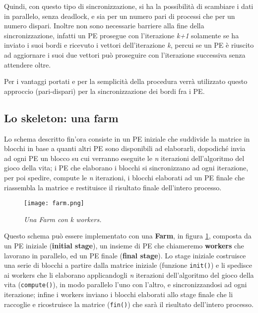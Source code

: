 Quindi, con questo tipo di sincronizzazione, si ha la possibilit\`a di scambiare i dati in parallelo, senza deadlock, e sia per un numero pari di processi che per un numero dispari. Inoltre non sono necessarie barriere alla fine della sincronizzazione, infatti un PE prosegue con l'iterazione \textit{k+1} solamente se ha inviato i suoi bordi e ricevuto i vettori dell'iterazione \textit{k}, percui se un PE \`e riuscito ad aggiornare i suoi due vettori pu\`o proseguire con l'iterazione successiva senza attendere oltre.

Per i vantaggi portati e per la semplicit\`a della procedura verr\`a utilizzato questo approccio (pari-dispari) per la sincronizzazione dei bordi fra i PE.

\subsection{Lo skeleton: una farm}
Lo schema descritto fin'ora consiste in un PE iniziale che suddivide la matrice in blocchi in base a quanti altri PE sono disponibili ad elaborarli, dopodich\'e invia ad ogni PE un blocco su cui verranno eseguite le \textit{n} iterazioni dell'algoritmo del gioco della vita; i PE che elaborano i blocchi si sincronizzano ad ogni iterazione, per poi spedire, compute le \textit{n} iterazioni, i blocchi elaborati ad un PE finale che riassembla la matrice e restituisce il risultato finale dell'intero processo.
\begin{figure}[ht]
  \centering
  \texttt{[image: farm.png]}
  \caption{\emph{Una Farm con \textit{k} workers.}}
  \label{fig:farm}
\end{figure}

Questo schema pu\`o essere implementato con una \textbf{Farm}, in figura \ref{fig:farm}, composta da un PE iniziale (\textbf{initial stage}), un insieme di PE che chiameremo \textbf{workers} che lavorano in parallelo, ed un PE finale (\textbf{final stage}). Lo stage iniziale costruisce una serie di blocchi a partire dalla matrice iniziale (funzione \texttt{init()}) e li spedisce ai workers che li elaborano applicandogli \textit{n} iterazioni dell'algoritmo del gioco della vita (\texttt{compute()}), in modo parallelo l'uno con l'altro, e sincronizzandosi ad ogni iterazione; infine i workers inviano i blocchi elaborati allo stage finale che li raccoglie e ricostruisce la matrice (\texttt{fin()}) che sar\`a il risultato dell'intero processo.

